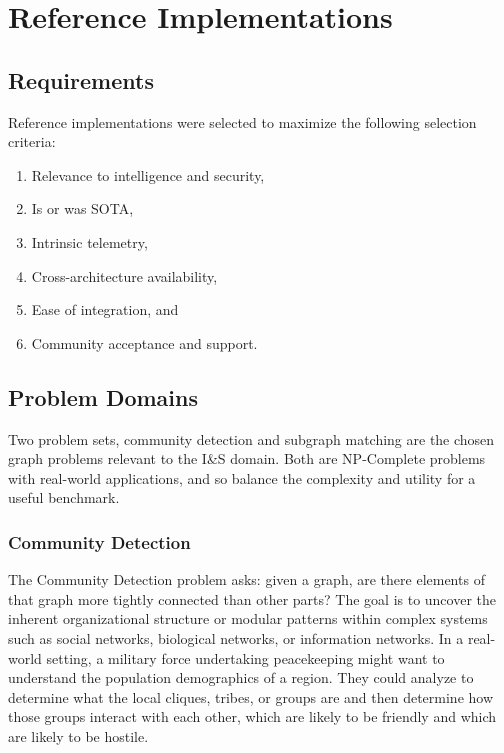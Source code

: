 \section{Reference Implementations}\label{section:implementations}

\subsection{Requirements}
    Reference implementations were selected to maximize the following selection criteria:
    \begin{enumerate}
        \itemsep0em
        \item Relevance to intelligence and security,
        \item Is or was SOTA,
        \item Intrinsic telemetry,
        \item Cross-architecture availability,
        \item Ease of integration, and
        \item Community acceptance and support.
    \end{enumerate}
    
\subsection{Problem Domains}
    Two problem sets, community detection and subgraph matching are the chosen graph problems relevant to the I\&S domain. 
    Both are NP-Complete problems with real-world applications, and so balance the complexity and utility for a useful benchmark.    

    \subsubsection{Community Detection}
        The Community Detection problem asks: given a graph, are there elements of that graph more tightly connected than other parts? 
        The goal is to uncover the inherent organizational structure or modular patterns within complex systems such as social networks, biological networks, or information networks. 
        In a real-world setting, a military force undertaking peacekeeping might want to understand the population demographics of a region. 
        They could analyze to determine what the local cliques, tribes, or groups are and then determine how those groups interact with each other, which are likely to be friendly and which are likely to be hostile.

